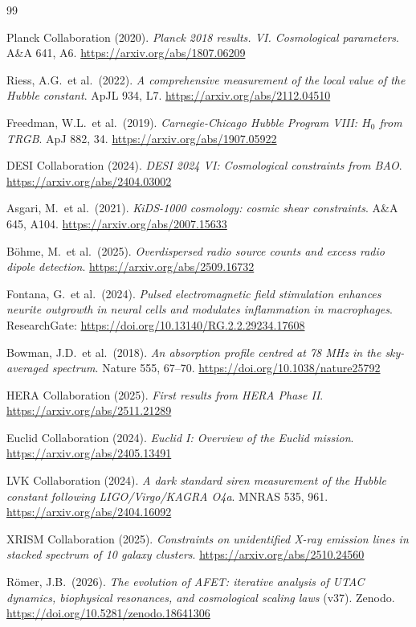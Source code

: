 \documentclass[12pt,a4paper]{article}
\theoremstyle{definition}
\begin{document}

\begin{thebibliography}{99}

Planck Collaboration (2020).
\textit{Planck 2018 results. VI. Cosmological parameters}.
A\&A 641, A6.
\url{https://arxiv.org/abs/1807.06209}

Riess, A.G.\ et al.\ (2022).
\textit{A comprehensive measurement of the local value of the Hubble constant}.
ApJL 934, L7.
\url{https://arxiv.org/abs/2112.04510}

Freedman, W.L.\ et al.\ (2019).
\textit{Carnegie-Chicago Hubble Program VIII: $H_0$ from TRGB}.
ApJ 882, 34.
\url{https://arxiv.org/abs/1907.05922}

DESI Collaboration (2024).
\textit{DESI 2024 VI: Cosmological constraints from BAO}.
\url{https://arxiv.org/abs/2404.03002}

Asgari, M.\ et al.\ (2021).
\textit{KiDS-1000 cosmology: cosmic shear constraints}.
A\&A 645, A104.
\url{https://arxiv.org/abs/2007.15633}

Böhme, M.\ et al.\ (2025).
\textit{Overdispersed radio source counts and excess radio dipole detection}.
\url{https://arxiv.org/abs/2509.16732}

Fontana, G.\ et al.\ (2024).
\textit{Pulsed electromagnetic field stimulation enhances neurite outgrowth
in neural cells and modulates inflammation in macrophages}.
ResearchGate: \url{https://doi.org/10.13140/RG.2.2.29234.17608}

Bowman, J.D.\ et al.\ (2018).
\textit{An absorption profile centred at 78 MHz in the sky-averaged spectrum}.
Nature 555, 67--70.
\url{https://doi.org/10.1038/nature25792}

HERA Collaboration (2025).
\textit{First results from HERA Phase II}.
\url{https://arxiv.org/abs/2511.21289}

Euclid Collaboration (2024).
\textit{Euclid I: Overview of the Euclid mission}.
\url{https://arxiv.org/abs/2405.13491}

LVK Collaboration (2024).
\textit{A dark standard siren measurement of the Hubble constant
following LIGO/Virgo/KAGRA O4a}.
MNRAS 535, 961.
\url{https://arxiv.org/abs/2404.16092}

XRISM Collaboration (2025).
\textit{Constraints on unidentified X-ray emission lines in stacked
spectrum of 10 galaxy clusters}.
\url{https://arxiv.org/abs/2510.24560}

Römer, J.B.\ (2026).
\textit{The evolution of AFET: iterative analysis of UTAC dynamics,
biophysical resonances, and cosmological scaling laws} (v37).
Zenodo. \url{https://doi.org/10.5281/zenodo.18641306}

\end{thebibliography}
\end{document}
